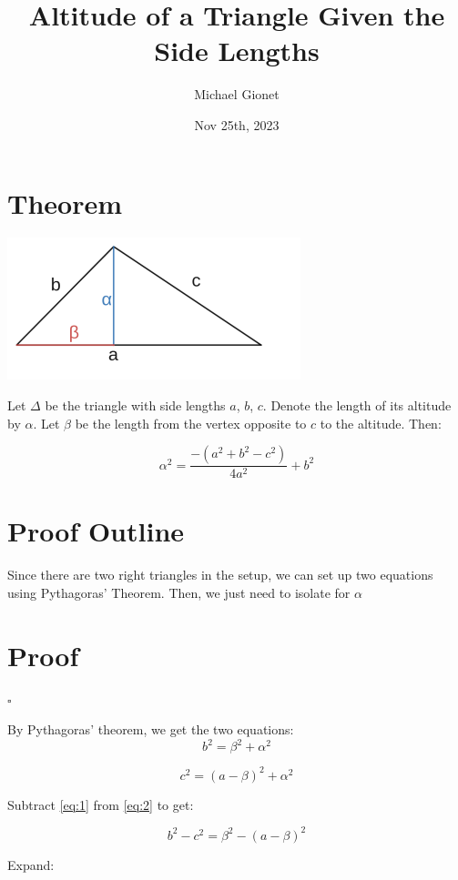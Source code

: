 \documentclass{article}
\title{Altitude of a Triangle Given the Side Lengths}
\author{Michael Gionet}
\date{Nov 25th, 2023}
\begin{document}
	\maketitle
	
	\section{Theorem}
	
	\includegraphics{altitude}
	
	
	Let $\Delta$ be the triangle with side lengths $a$, $b$, $c$. Denote the length of its altitude by $\alpha$. 
	Let $\beta$ be the length from the vertex opposite to $c$ to the altitude. Then:
	
	$$ \alpha^{2} = \frac{-(a^2 + b^2 - c^2)}{4a^{2}} + b^2 $$ 
	
	\section{Proof Outline}
	
	Since there are two right triangles in the setup, we can set up two equations using Pythagoras' Theorem. Then, we just need to isolate for $\alpha$
	
	\section{Proof}
	
	$ \square $
	
	By Pythagoras' theorem, we get the two equations:
	\begin{equation}
	b^2 = \beta^2 + \alpha^2 \label{eq:1}
	\end{equation}
	
	\begin{equation}
	c^2 = (a-\beta)^2 + \alpha^2 \label{eq:2}
	\end{equation}
	
	Subtract \ref{eq:1} from \ref{eq:2} to get:
	
	$$ b^2 - c^2 = \beta^2 - (a - \beta)^2 $$
	
	Expand:
	
\end{document}
